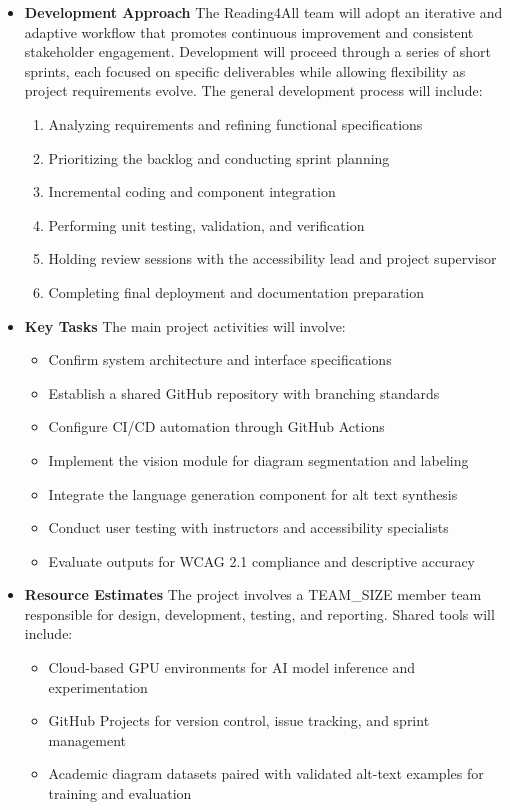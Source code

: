 \documentclass[12pt]{article}
\begin{document}
\begin{itemize}
    \item \textbf{Development Approach}  
    The Reading4All team will adopt an iterative and adaptive workflow that promotes continuous improvement and consistent stakeholder engagement. Development will proceed through a series of short sprints, each focused on specific deliverables while allowing flexibility as project requirements evolve.  
    The general development process will include:
    \begin{enumerate}
        \item Analyzing requirements and refining functional specifications  
        \item Prioritizing the backlog and conducting sprint planning  
        \item Incremental coding and component integration  
        \item Performing unit testing, validation, and verification  
        \item Holding review sessions with the accessibility lead and project supervisor  
        \item Completing final deployment and documentation preparation  
    \end{enumerate}

    \item \textbf{Key Tasks}  
    The main project activities will involve:
    \begin{itemize}
      \item Confirm system architecture and interface specifications
      \item Establish a shared GitHub repository with branching standards
      \item Configure CI/CD automation through GitHub Actions
      \item Implement the vision module for diagram segmentation and labeling
      \item Integrate the language generation component for alt text synthesis
      \item Conduct user testing with instructors and accessibility specialists
      \item Evaluate outputs for WCAG 2.1 compliance and descriptive accuracy
    \end{itemize}

  \item \textbf{Resource Estimates}
    The project involves a TEAM\_SIZE member team responsible for design,
    development, testing, and reporting. Shared tools will include:
    \begin{itemize}
        \item Cloud-based GPU environments for AI model inference and experimentation  
        \item GitHub Projects for version control, issue tracking, and sprint management  
        \item Academic diagram datasets paired with validated alt-text examples for training and evaluation  
    \end{itemize}


\end{itemize}
\end{document}
